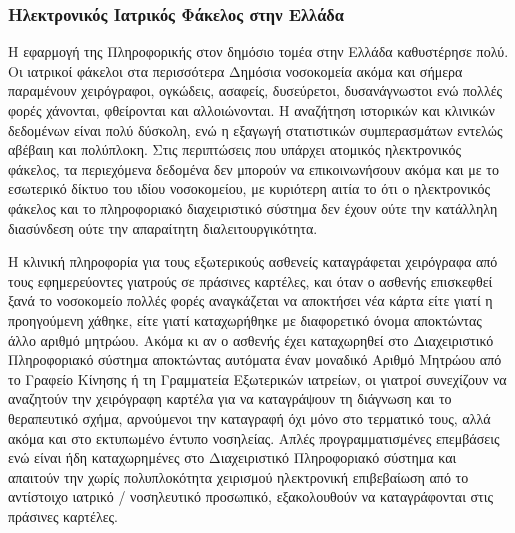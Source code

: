 \subsubsection{Ηλεκτρονικός Ιατρικός Φάκελος στην Ελλάδα}

		Η εφαρμογή της Πληροφορικής στον δημόσιο τομέα στην Ελλάδα καθυστέρησε πολύ. Οι ιατρικοί φάκελοι στα περισσότερα Δημόσια νοσοκομεία ακόμα και σήμερα παραμένουν χειρόγραφοι, ογκώδεις, ασαφείς, δυσεύρετοι, δυσανάγνωστοι ενώ πολλές φορές χάνονται, φθείρονται και αλλοιώνονται. Η αναζήτηση ιστορικών και κλινικών δεδομένων είναι πολύ δύσκολη, ενώ η εξαγωγή στατιστικών συμπερασμάτων εντελώς αβέβαιη και πολύπλοκη. Στις περιπτώσεις που υπάρχει ατομικός ηλεκτρονικός φάκελος, τα περιεχόμενα δεδομένα δεν μπορούν να επικοινωνήσουν ακόμα και με το εσωτερικό δίκτυο του ιδίου νοσοκομείου, με κυριότερη αιτία το ότι ο ηλεκτρονικός φάκελος και το πληροφοριακό διαχειριστικό σύστημα δεν έχουν ούτε την κατάλληλη διασύνδεση ούτε την απαραίτητη διαλειτουργικότητα.

		H κλινική πληροφορία για τους εξωτερικούς ασθενείς καταγράφεται χειρόγραφα από τους εφημερεύοντες γιατρούς σε πράσινες καρτέλες, και όταν ο ασθενής επισκεφθεί ξανά το νοσοκομείο πολλές φορές αναγκάζεται να αποκτήσει νέα κάρτα είτε γιατί η προηγούμενη χάθηκε, είτε γιατί καταχωρήθηκε με διαφορετικό όνομα αποκτώντας άλλο αριθμό μητρώου. Ακόμα κι αν ο ασθενής έχει καταχωρηθεί στο Διαχειριστικό Πληροφοριακό σύστημα αποκτώντας αυτόματα έναν μοναδικό Αριθμό Μητρώου από το Γραφείο Κίνησης ή τη Γραμματεία Εξωτερικών ιατρείων, οι γιατροί συνεχίζουν να αναζητούν την χειρόγραφη καρτέλα για να καταγράψουν τη διάγνωση και το θεραπευτικό σχήμα, αρνούμενοι την καταγραφή όχι μόνο στο τερματικό τους, αλλά ακόμα και στο εκτυπωμένο έντυπο νοσηλείας. Απλές προγραμματισμένες επεμβάσεις ενώ είναι ήδη καταχωρημένες στο Διαχειριστικό Πληροφοριακό σύστημα και απαιτούν την χωρίς πολυπλοκότητα χειρισμού ηλεκτρονική επιβεβαίωση από το αντίστοιχο ιατρικό / νοσηλευτικό προσωπικό, εξακολουθούν να καταγράφονται στις πράσινες καρτέλες.

